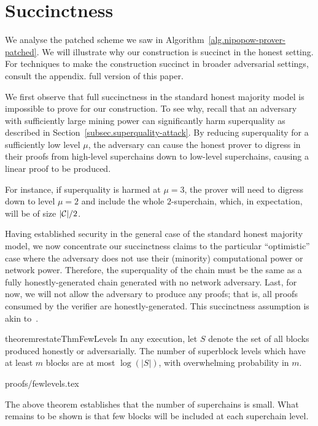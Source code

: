 \section{Succinctness}
\label{sec.succinctness}

We analyse the patched scheme we saw in
Algorithm~\ref{alg.nipopow-prover-patched}. We will illustrate why our
construction is succinct in the honest setting. For techniques to make the
construction succinct in broader adversarial settings, consult the
\ifhasappendix
appendix.
\else
full version of this paper.
\fi

We first observe that full succinctness in the standard honest majority model is
impossible to prove for our construction. To see why, recall that an adversary
with sufficiently large mining power can significantly harm superquality as
described in Section~\ref{subsec.superquality-attack}. By reducing superquality
for a sufficiently low level $\mu$, the adversary can cause the honest prover to
digress in their proofs from high-level superchains down to low-level
superchains, causing a linear proof to be produced.

For instance, if superquality is harmed at $\mu = 3$, the prover will
need to digress down to level $\mu = 2$ and include the whole $2$-superchain,
which, in expectation, will be of size $|\mathcal{C}|/2$.

Having established security in the general case of the standard honest majority
model, we now concentrate our succinctness claims to the particular
``optimistic'' case where the adversary does not use their (minority)
computational power or network power. Therefore, the superquality of the chain
must be the same as a fully honestly-generated chain generated with no network
adversary. Last, for now, we will not allow the adversary to produce any proofs;
that is, all proofs consumed by the verifier are honestly-generated. This
succinctness assumption is akin to~\cite{KLS}.

\begin{restatable}{theorem}{restateThmFewLevels}
    \label{thm.few-levels}
    In any execution, let $S$ denote the set of all blocks produced honestly or
    adversarially. The number of superblock levels which have at least $m$
    blocks are at most $\log(|S|)$, with overwhelming probability in $m$.
\end{restatable}
\ifonecolumn
{proofs/fewlevels.tex}
\fi

The above theorem establishes that the number of superchains is small. What
remains to be shown is that few blocks will be included at each superchain
level.

